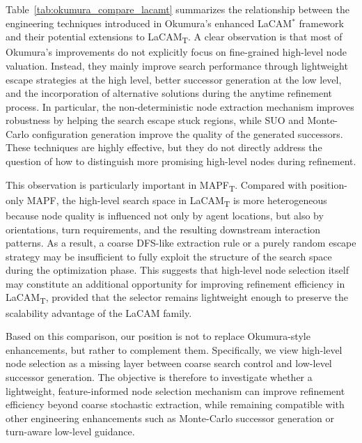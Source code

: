 \documentclass[lettersize,journal]{IEEEtran}
\begin{document}
Table~\ref{tab:okumura_compare_lacamt} summarizes the relationship between the engineering techniques introduced in Okumura's enhanced LaCAM$^{*}$ framework and their potential extensions to LaCAM\textsubscript{T}. A clear observation is that most of Okumura's improvements do not explicitly focus on fine-grained high-level node valuation. Instead, they mainly improve search performance through lightweight escape strategies at the high level, better successor generation at the low level, and the incorporation of alternative solutions during the anytime refinement process. In particular, the non-deterministic node extraction mechanism improves robustness by helping the search escape stuck regions, while SUO and Monte-Carlo configuration generation improve the quality of the generated successors. These techniques are highly effective, but they do not directly address the question of how to distinguish more promising high-level nodes during refinement. 

This observation is particularly important in MAPF\textsubscript{T}. Compared with position-only MAPF, the high-level search space in LaCAM\textsubscript{T} is more heterogeneous because node quality is influenced not only by agent locations, but also by orientations, turn requirements, and the resulting downstream interaction patterns. As a result, a coarse DFS-like extraction rule or a purely random escape strategy may be insufficient to fully exploit the structure of the search space during the optimization phase. This suggests that high-level node selection itself may constitute an additional opportunity for improving refinement efficiency in LaCAM\textsubscript{T}, provided that the selector remains lightweight enough to preserve the scalability advantage of the LaCAM family.

Based on this comparison, our position is not to replace Okumura-style enhancements, but rather to complement them. Specifically, we view high-level node selection as a missing layer between coarse search control and low-level successor generation. The objective is therefore to investigate whether a lightweight, feature-informed node selection mechanism can improve refinement efficiency beyond coarse stochastic extraction, while remaining compatible with other engineering enhancements such as Monte-Carlo successor generation or turn-aware low-level guidance.
\end{document}

